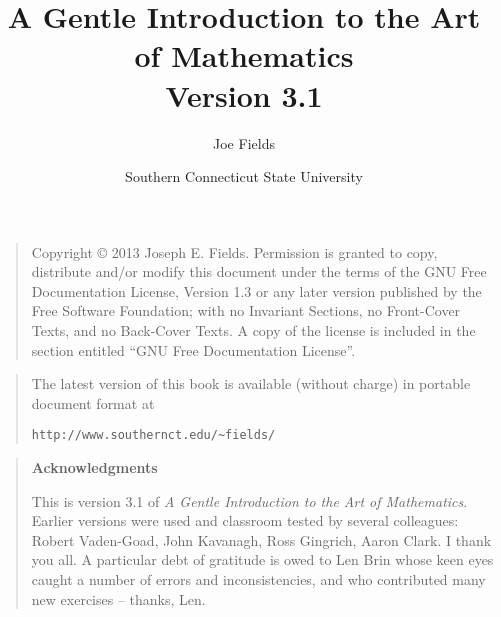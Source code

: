 \documentclass[dvips,12pt,twoside]{book}
\begin{document}
\frontmatter

\title{A Gentle Introduction to the Art of Mathematics\\ {\small Version 3.1  }}
\author{Joe Fields}
\date{Southern Connecticut State University}

\maketitle

\clearpage

\rule{0pt}{0pt}

\vfill

\begin{quote}
    Copyright \copyright{}  2013  Joseph E. Fields.
    Permission is granted to copy, distribute and/or modify this document
    under the terms of the GNU Free Documentation License, Version 1.3
    or any later version published by the Free Software Foundation;
    with no Invariant Sections, no Front-Cover Texts, and no Back-Cover Texts.
    A copy of the license is included in the section entitled ``GNU
    Free Documentation License''.
\end{quote}

\vfill

\begin{quote}
The latest version of this book is available (without charge) in portable document format at \newline
\rule{0pt}{0pt} \hspace{1in} \verb+http://www.southernct.edu/~fields/+
\end{quote}

\vfill

\clearpage

\rule{0pt}{0pt}

\vfill

\begin{quote}
{\Large \bf Acknowledgments} 

   This is version 3.1 of {\em A Gentle Introduction to the Art of Mathematics}.
Earlier versions were used and classroom tested by several colleagues: 
Robert Vaden-Goad, John Kavanagh, Ross Gingrich, Aaron Clark.  I thank you all.  
A particular debt of gratitude is owed to Len Brin whose keen eyes caught 
a number of errors and inconsistencies, and who contributed many new 
exercises -- thanks, Len. 
  
\end{quote}
\end{document}
